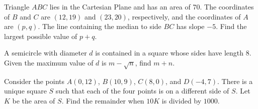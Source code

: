 \documentclass[11pt]{article}
\theoremstyle{definition}
\begin{document}
%	















\begin{question}[name={2005 AIME I, \href{https://artofproblemsolving.com/community/c4p366697}{Problem 10}}]
	Triangle $ABC$ lies in the Cartesian Plane and has an area of 70. The coordinates of $B$ and $C$ are $(12,19)$ and $(23,20)$, respectively, and the coordinates of $A$ are $(p,q)$. The line containing the median to side $BC$ has slope $-5$. Find the largest possible value of $p+q$.	
\end{question}


%	












\begin{question}[name={2005 AIME I, \href{https://artofproblemsolving.com/community/c4p366826}{Problem 11}}]
	A semicircle with diameter $d$ is contained in a square whose sides have length $8$. Given the maximum value of $d$ is $m- \sqrt{n}$, find $m+n$.
\end{question}


%	










\begin{question}[name={2005 AIME I, \href{https://artofproblemsolving.com/community/c4p367840}{Problem 14}}]
	Consider the points $A(0,12)$, $B(10,9)$, $C(8,0)$, and $D(-4,7)$. There is a unique square $S$ such that each of the four points is on a different side of $S$. Let $K$ be the area of $S$. Find the remainder when $10K$ is divided by $1000$.
\end{question}
\end{document}
